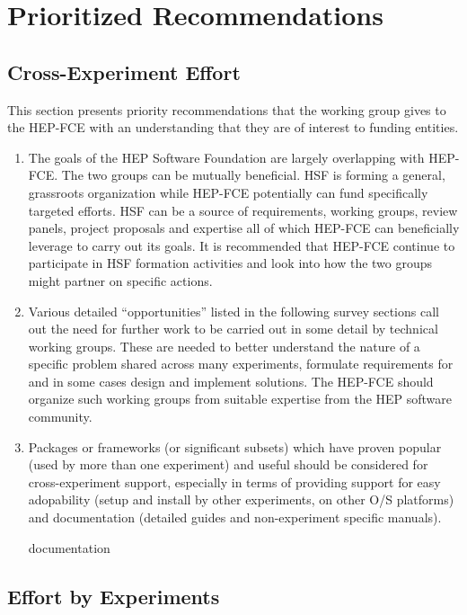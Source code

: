 \section{Prioritized Recommendations}

\subsection{Cross-Experiment Effort}

This section presents priority recommendations that the working group
gives to the HEP-FCE with an understanding that they are of interest
to funding entities.

\begin{enumerate}
\item The goals of the HEP Software Foundation are
  largely overlapping with HEP-FCE.  The two groups can be mutually
  beneficial.  HSF is forming a general, grassroots organization while
  HEP-FCE potentially can fund specifically targeted efforts.  HSF can
  be a source of requirements, working groups, review panels, project
  proposals and expertise all of which HEP-FCE can beneficially
  leverage to carry out its goals.  It is recommended that HEP-FCE
  continue to participate in HSF formation activities and look into
  how the two groups might partner on specific actions.

\item Various detailed ``opportunities'' listed in the following
  survey sections call out the need for further work to be carried out
  in some detail by technical working groups. These are needed to
  better understand the nature of a specific problem shared across
  many experiments, formulate requirements for and in some cases
  design and implement solutions.  The HEP-FCE should organize such
  working groups from suitable expertise from the HEP software community.

\item Packages or frameworks (or significant subsets) which have proven 
popular (used by more than one experiment) and useful should be considered for
cross-experiment support, especially in terms of providing support for
easy adopability (setup and install by other experiments, on other 
O/S platforms) and documentation (detailed guides and non-experiment
specific manuals).

documentation

\end{enumerate}


\subsection{Effort by Experiments}

